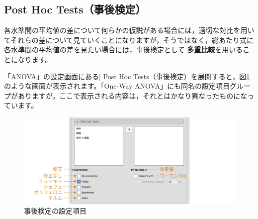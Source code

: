 \documentclass[
  12pt,
  a5jpaper,
  lualatex, ja=standard]{bxjsbook}
\renewcommand{\emph}[1]{\textbf{\color{emph} #1}}
\begin{document}
\hypertarget{sub:ANOVA-anova-posthoc}{%
\subsection{Post Hoc Tests（事後検定）}\label{sub:ANOVA-anova-posthoc}}

各水準間の平均値の差について何らかの仮説がある場合には，適切な対比を用いてそれらの差について見ていくことになりますが，そうではなく，総あたり式に各水準間の平均値の差を見たい場合には，事後検定として\emph{多重比較}を用いることになります。

「ANOVA」の設定画面にある\colorbox{bar}{\textcolor{gmoji2}{| Post Hoc Tests}}（事後検定）を展開すると，図\ref{fig:ANOVA-anova-posthoc}のような画面が表示されます。「One-Way ANOVA」にも同名の設定項目グループがありますが，ここで表示される内容は，それとはかなり異なったものになっています。

\begin{figure}[!ht]

{\centering \includegraphics[width=1\linewidth]{images/ANOVA/anova-posthoc} 

}

\caption{事後検定の設定項目}\label{fig:ANOVA-anova-posthoc}
\end{figure}
\end{document}
